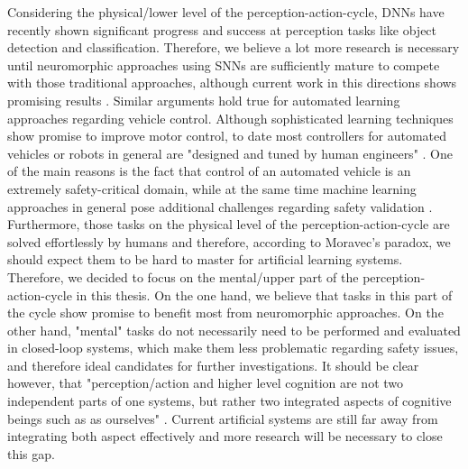 Considering the physical/lower level of the perception-action-cycle, \acp{DNN} have recently shown significant progress and success at perception tasks like object detection and classification.
Therefore, we believe a lot more research is necessary until neuromorphic approaches using \acp{SNN} are sufficiently mature to compete with those traditional approaches, although current work in this directions shows promising results \cite{Hunsberger2015}.
Similar arguments hold true for automated learning approaches regarding vehicle control.
Although sophisticated learning techniques show promise to improve motor control, to date most controllers for automated vehicles or robots in general are "designed and tuned by human engineers" \cite{Deisenroth2013}.
One of the main reasons is the fact that control of an automated vehicle is an extremely safety-critical domain, while at the same time machine learning approaches in general pose additional challenges regarding safety validation \cite{Koopman2016}.
Furthermore, those tasks on the physical level of the perception-action-cycle are solved effortlessly by humans and therefore, according to Moravec's paradox, we should expect them to be hard to master for artificial learning systems.
Therefore, we decided to focus on the mental/upper part of the perception-action-cycle in this thesis.
On the one hand, we believe that tasks in this part of the cycle show promise to benefit most from neuromorphic approaches.
On the other hand, "mental" tasks do not necessarily need to be performed and evaluated in closed-loop systems, which make them less problematic regarding safety issues, and therefore ideal candidates for further investigations.
It should be clear however, that "perception/action and higher level cognition are not two independent parts of one systems, but rather two integrated aspects of cognitive beings such as as ourselves" \cite{Eliasmith2013}.
Current artificial systems are still far away from integrating both aspect effectively and more research will be necessary to close this gap.

